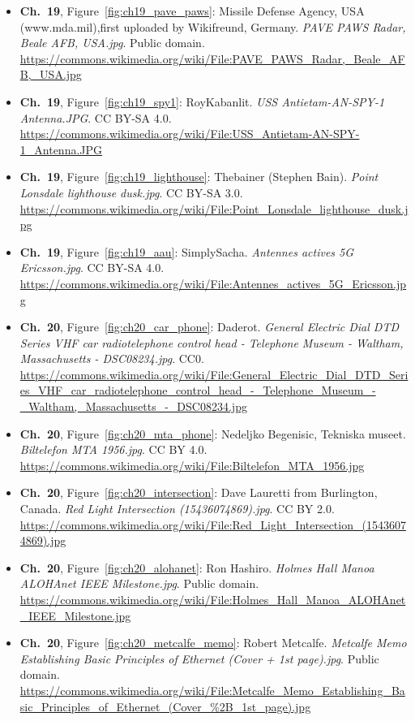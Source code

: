 \begin{small}
\begin{itemize}[leftmargin=0pt,itemsep=2pt,label={}]
\item \textbf{Ch.~19}, Figure~\ref{fig:ch19_pave_paws}: Missile Defense Agency, USA (www.mda.mil),first uploaded by Wikifreund, Germany. \emph{PAVE PAWS Radar, Beale AFB, USA.\allowbreak{}jpg}. Public domain. \url{https://commons.wikimedia.org/wiki/File:PAVE_PAWS_Radar,_Beale_AFB,_USA.jpg}
\item \textbf{Ch.~19}, Figure~\ref{fig:ch19_spy1}: RoyKabanlit. \emph{USS Antietam-\allowbreak{}AN-\allowbreak{}SPY-\allowbreak{}1 Antenna.\allowbreak{}JPG}. CC BY-SA 4.0. \url{https://commons.wikimedia.org/wiki/File:USS_Antietam-AN-SPY-1_Antenna.JPG}
\item \textbf{Ch.~19}, Figure~\ref{fig:ch19_lighthouse}: Thebainer (Stephen Bain). \emph{Point Lonsdale lighthouse dusk.\allowbreak{}jpg}. CC BY-SA 3.0. \url{https://commons.wikimedia.org/wiki/File:Point_Lonsdale_lighthouse_dusk.jpg}
\item \textbf{Ch.~19}, Figure~\ref{fig:ch19_aau}: SimplySacha. \emph{Antennes actives 5G Ericsson.\allowbreak{}jpg}. CC BY-SA 4.0. \url{https://commons.wikimedia.org/wiki/File:Antennes_actives_5G_Ericsson.jpg}
\item \textbf{Ch.~20}, Figure~\ref{fig:ch20_car_phone}: Daderot. \emph{General Electric Dial DTD Series VHF car radiotelephone control head -\allowbreak{} Telephone Museum -\allowbreak{} Waltham, Massachusetts -\allowbreak{} DSC08234.\allowbreak{}jpg}. CC0. \url{https://commons.wikimedia.org/wiki/File:General_Electric_Dial_DTD_Series_VHF_car_radiotelephone_control_head_-_Telephone_Museum_-_Waltham,_Massachusetts_-_DSC08234.jpg}
\item \textbf{Ch.~20}, Figure~\ref{fig:ch20_mta_phone}: Nedeljko Begenisic, Tekniska museet. \emph{Biltelefon MTA 1956.\allowbreak{}jpg}. CC BY 4.0. \url{https://commons.wikimedia.org/wiki/File:Biltelefon_MTA_1956.jpg}
\item \textbf{Ch.~20}, Figure~\ref{fig:ch20_intersection}: Dave Lauretti from Burlington, Canada. \emph{Red Light Intersection (15436074869).\allowbreak{}jpg}. CC BY 2.0. \url{https://commons.wikimedia.org/wiki/File:Red_Light_Intersection_(15436074869).jpg}
\item \textbf{Ch.~20}, Figure~\ref{fig:ch20_alohanet}: Ron Hashiro. \emph{Holmes Hall Manoa ALOHAnet IEEE Milestone.\allowbreak{}jpg}. Public domain. \url{https://commons.wikimedia.org/wiki/File:Holmes_Hall_Manoa_ALOHAnet_IEEE_Milestone.jpg}
\item \textbf{Ch.~20}, Figure~\ref{fig:ch20_metcalfe_memo}: Robert Metcalfe. \emph{Metcalfe Memo Establishing Basic Principles of Ethernet (Cover + 1st page).\allowbreak{}jpg}. Public domain. \url{https://commons.wikimedia.org/wiki/File:Metcalfe_Memo_Establishing_Basic_Principles_of_Ethernet_(Cover_%2B_1st_page).jpg}

\end{itemize}
\end{small}
